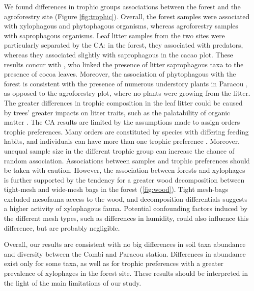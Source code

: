 \documentclass[fleqn,10pt]{ArtEcoFoG} %
\begin{document}
We found differences in trophic groups associations between the forest and the agroforestry site (Figure \ref{fig:trophic}). Overall, the forest samples were associated with xylophagous and phytophagous organisms, whereas agroforestry samples with saprophagous organisms. Leaf litter samples from the two sites were particularly separated by the CA: in the forest, they associated with predators, whereas they associated slightly with saprophagous in the cacao plot. These results concur with \citet{rousseau_shade_2021} , who linked the presence of litter saprophagous taxa to the presence of cocoa leaves. Moreover, the association of phytophagous with the forest is consistent with the presence of numerous understory plants in Paracou \citep{rousseau_macrofauna_2014}, as opposed to the agroforestry plot, where no plants were growing from the litter. The greater differences in trophic composition in the leaf litter could be caused by trees' greater impacts on litter traits, such as the palatability of organic matter \citep{korboulewsky_how_2016, rousseau_shade_2021, moco_relationships_2010}. The CA results are limited by the assumptions made to assign orders trophic preferences. Many orders are constituted by species with differing feeding habits, and individuals can have more than one trophic preference \citep{potapov_feeding_2022}. Moreover, unequal sample size in the different trophic group can increase the chance of random association. Associations between samples and trophic preferences should be taken with caution. However, the association between forests and xylophages is further supported by the tendency for a greater wood decomposition between tight-mesh and wide-mesh bags in the forest (\ref{fig:wood}). Tight mesh-bags excluded mesofauna access to the wood, and decomposition differentials suggests a higher activity of xylophagous fauna. Potential confounding factors induced by the different mesh types, such as differences in humidity, could also influence this difference, but are probably negligible.

Overall, our results are consistent with no big differences in soil taxa abundance and diversity between the Combi and Paracou station. Differences in abundance exist only for some taxa, as well as for trophic preferences with a greater prevalence of xylophages in the forest site. These results should be interpreted in the light of the main limitations of our study.
\end{document}
